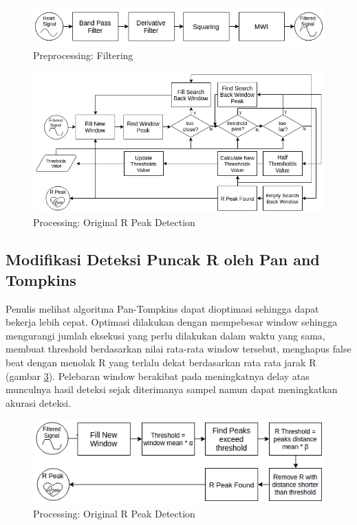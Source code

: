\documentclass[]{indojc}
\begin{document}
\begin{figure}[htbp]
\centerline{\includegraphics[scale=0.65]{images/preprocessing.png}}
\caption{Preprocessing: Filtering}
\label{fig:preprocessing}
\end{figure}

\begin{figure}[htbp]
\centerline{\includegraphics[scale=0.6]{images/processing_ori.png}}
\caption{Processing: Original R Peak Detection}
\label{fig:processing_ori}
\end{figure}

\subsection{Modifikasi Deteksi Puncak R oleh Pan and Tompkins}
Penulis melihat algoritma Pan-Tompkins dapat dioptimasi sehingga dapat bekerja lebih cepat. Optimasi dilakukan dengan mempebesar window sehingga mengurangi jumlah eksekusi yang perlu dilakukan dalam waktu yang sama, membuat threshold berdasarkan nilai rata-rata window tersebut, menghapus false beat dengan menolak R yang terlalu dekat berdasarkan rata rata jarak R (gambar \ref{fig:processing_modif}). Pelebaran window berakibat pada meningkatnya delay atas munculnya hasil deteksi sejak diterimanya sampel namun dapat meningkatkan akurasi deteksi.

\begin{figure}[htbp]
\centerline{\includegraphics[scale=0.65]{images/processing_modif.png}}
\caption{Processing: Original R Peak Detection}
\label{fig:processing_modif}
\end{figure}
\end{document}
